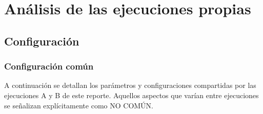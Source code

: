 \documentclass[a4paper,10pt]{article}
\begin{document}
\section{Análisis de las ejecuciones propias}
\label{sec:mis_experimentos}

\subsection{Configuración}

\subsubsection{Configuración común}
A continuación se detallan los parámetros y configuraciones compartidas por las ejecuciones A y B de este reporte. Aquellos aspectos que varían entre ejecuciones se señalizan explícitamente como \guillemotleft NO COMÚN\guillemotright.
\end{document}
